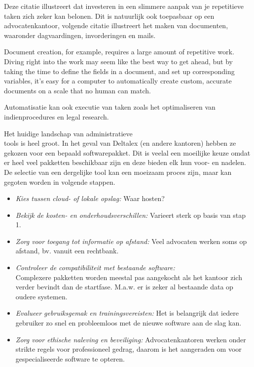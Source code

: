 Deze citatie illustreert dat investeren in een slimmere aanpak van je repetitieve taken zich zeker kan belonen. Dit is natuurlijk ook toepasbaar op een advocatenkantoor, volgende citatie illustreert het maken van documenten, waaronder dagvaardingen, invorderingen en mails.

Document creation, for example, requires a large amount of repetitive work. Diving right into the work may seem like the best way to get ahead, but by taking the time to define the fields in a document, and set up corresponding variables, it’s easy for a computer to automatically create custom, accurate documents on a scale that no human can match.
\autocite{ThomsonReuters2023}

Automatisatie kan ook executie van taken zoals het optimaliseren van indienprocedures en legal research. \autocite{Aston2023}

Het huidige landschap van administratieve\\ tools is heel groot. In het geval van Deltalex (en andere kantoren) hebben ze gekozen voor een bepaald softwarepakket. Dit is veelal een moeilijke keuze omdat er heel veel pakketten beschikbaar zijn en deze bieden elk hun voor- en nadelen. De selectie van een dergelijke tool kan een moeizaam proces zijn, maar kan gegoten worden in volgende stappen.
\autocite{Clio2023}

\begin{itemize}
	\item \emph{Kies tussen cloud- of lokale opslag:} Waar hosten? 
        \item \emph{Bekijk de kosten- en onderhoudsverschillen:} Varieert sterk op basis van stap 1.
        \item \emph{Zorg voor toegang tot informatie op afstand:} Veel advocaten werken soms op afstand, bv. vanuit een rechtbank.
        \item \emph{Controleer de compatibiliteit met bestaande software:}\\ Complexere pakketten worden meestal pas aangekocht als het kantoor zich verder bevindt dan de startfase. M.a.w. er is zeker al bestaande data op oudere systemen.
        \item \emph{Evalueer gebruiksgemak en trainingsvereisten:} Het is belangrijk dat iedere gebruiker zo snel en probleemloos met de nieuwe software aan de slag kan.
        \item \emph{Zorg voor ethische naleving en beveiliging:} Advocatenkantoren werken onder strikte regels voor professioneel gedrag, daarom is het aangeraden om voor gespecialiseerde software te opteren.
\end{itemize}

